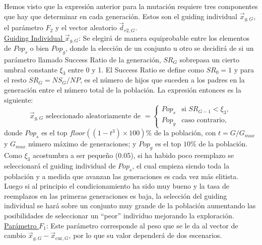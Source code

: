 \documentclass{article}
\begin{document}
Hemos visto que la expresión anterior para la mutación requiere tres componentes que hay que determinar en cada generación. Estos son el guiding individual $\vec{x}_{g,G}$, el parámetro $F_{2}$ y el vector aleatorio $\vec{d}_{r2,G}$.\\

\underline{Guiding Individual $\vec{x}_{g,G}$}: Se elegirá de manera equiprobable entre los elementos de $Pop_{s}$ o bien $Pop_{g}$, donde la elección de un conjunto u otro se decidirá de si un parámetro llamado Success Ratio de la generación, $SR_{G}$ sobrepasa un cierto umbral constante $\xi_{3}$ entre 0 y 1. El Success Ratio se define como $SR_{0}=1$ y para el resto $SR_{G}=NS_{G}/NP$, es el número de hijos que suceden a los padres en la generación entre el número total de la población. La expresión entonces es la siguiente:
\begin{equation}
    \vec{x}_{g,G} \text{ seleccionado aleatoriamente de } = \left\{\begin{array}{ll}
            Pop_{s} & \text{si }SR_{G-1}<\xi_3,\\
            Pop_{g} & \text{caso contrario},
    \end{array}\right.
\label{guiding}
\end{equation}
donde $Pop_{s}$ es el top $floor((1-t^{3})\times 100)\%$ de la población, con $t=G/G_{max}$ y $G_{max}$ número máximo de generaciones; y $Pop_{g}$ es el top $10\%$ de la población. Como $\xi_{3}$ acostumbra a ser pequeño (0.05), si ha habido poco reemplazo se seleccionará el guiding individual de $Pop_{s}$, el cual empieza siendo toda la población y a medida que avanzan las generaciones es cada vez más elitista. Luego si al principio el condicionamiento ha sido muy bueno y la tasa de reemplazos en las primeras generaciones es baja, la selección del guiding individual se hará sobre un conjunto muy grande de la población aumentando las posibilidades de seleccionar un ``peor'' individuo mejorando la exploración. \\

\underline{Parámetro $F_{1}$}: Este parámetro corresponde al peso que se le da al vector de cambio $\vec{x}_{g,G}-\vec{x}_{\text{cur}, G}$, por lo que su valor dependerá de dos escenarios.
\end{document}
